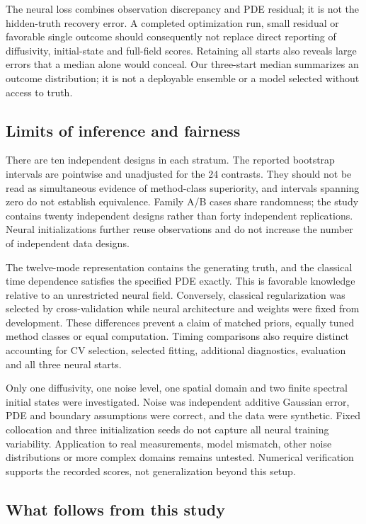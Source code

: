 \documentclass[10pt,a4paper]{article}
\begin{document}
The neural loss combines observation discrepancy and PDE residual; it is not
the hidden-truth recovery error. A completed optimization run, small residual or
favorable single outcome should consequently not replace direct reporting of
diffusivity, initial-state and full-field scores. Retaining all starts also
reveals large errors that a median alone would conceal. Our three-start median
summarizes an outcome distribution; it is not a deployable ensemble or a model
selected without access to truth.

\subsection{Limits of inference and fairness}

There are ten independent designs in each stratum. The reported bootstrap
intervals are pointwise and unadjusted for the 24 contrasts. They should not be
read as simultaneous evidence of method-class superiority, and intervals
spanning zero do not establish equivalence. Family A/B cases share randomness;
the study contains twenty independent designs rather than forty independent
replications. Neural initializations further reuse observations and do not
increase the number of independent data designs.

The twelve-mode representation contains the generating truth, and the classical
time dependence satisfies the specified PDE exactly. This is favorable knowledge
relative to an unrestricted neural field. Conversely, classical regularization
was selected by cross-validation while neural architecture and weights were
fixed from development. These differences prevent a claim of matched priors,
equally tuned method classes or equal computation. Timing comparisons also
require distinct accounting for CV selection, selected fitting, additional
diagnostics, evaluation and all three neural starts.

Only one diffusivity, one noise level, one spatial domain and two finite
spectral initial states were investigated. Noise was independent additive
Gaussian error, PDE and boundary assumptions were correct, and the data were
synthetic. Fixed collocation and three initialization seeds do not capture all
neural training variability. Application to real measurements, model mismatch,
other noise distributions or more complex domains remains untested. Numerical
verification supports the recorded scores, not generalization beyond this setup.

\subsection{What follows from this study}
\end{document}
